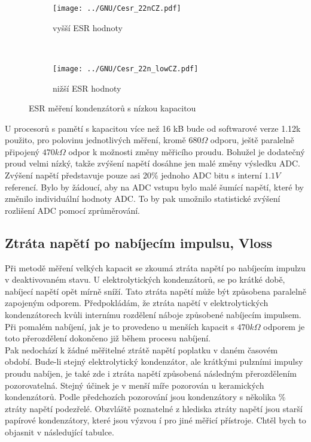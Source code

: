 \begin{figure}[H]
  \begin{subfigure}[b]{.5\textwidth}
    \centering
    \texttt{[image: ../GNU/Cesr\_22nCZ.pdf]}
    \caption{vyšší ESR hodnoty}
  \end{subfigure}
  ~
  \begin{subfigure}[b]{.5\textwidth}
    \centering
    \texttt{[image: ../GNU/Cesr\_22n\_lowCZ.pdf]}
    \caption{nižší ESR hodnoty}
  \end{subfigure}
  \caption{ESR měření kondenzátorů s nízkou kapacitou}
  \label{pic:Cesr_22n}
\end{figure}
 
U procesorů s pamětí s kapacitou více než 16 kB bude od softwarové verze 1.12k použito, pro polovinu jednotlivých měření, kromě \(680\Omega\) odporu, ještě paralelně připojený \(470k\Omega\) odpor
k možnosti změny měřicího proudu.
Bohužel je dodatečný proud velmi nízký, takže zvýšení napětí dosáhne jen malé změny výsledku ADC.
Zvýšení napětí představuje pouze asi 20\% jednoho ADC bitu s interní \(1.1V\) referencí.
Bylo by žádoucí, aby na ADC vstupu bylo malé šumící napětí, které by změnilo individuální hodnoty ADC.
To by pak umožnilo statistické zvýšení rozlišení ADC pomocí zprůměrování. 


\subsection{Ztráta napětí po nabíjecím impulsu, Vloss}
Při metodě měření velkých kapacit se zkoumá ztráta napětí po nabíjecím impulzu v deaktivovaném stavu.
U elektrolytických kondenzátorů, se po krátké době, nabíjecí napětí opět mírně sníží.
Tato ztráta napětí může být způsobena paralelně zapojeným odporem.
Předpokládám, že ztráta napětí v elektrolytických kondenzátorech kvůli internímu rozdělení náboje způsobené nabíjecím impulsem.
Při pomalém nabíjení, jak je to provedeno  u menších kapacit s \(470k\Omega\)  odporem
je toto přerozdělení dokončeno již během procesu nabíjení.\\ Pak nedochází k žádné měřitelné ztrátě napětí
poplatku v daném časovém období.
Bude-li stejný elektrolytický kondenzátor, ale krátkými pulzními impulsy proudu nabíjen, je také zde i ztráta napětí způsobená následným přerozdělením pozorovatelná.
Stejný účinek je v menší míře pozorován u keramických kondenzátorů.
Podle předchozích pozorování jsou kondenzátory s několika  \% ztráty napětí podezřelé.
Obzvláště poznatelné z hlediska ztráty napětí jsou starší papírové kondenzátory, které jsou výzvou í pro jiné měřicí přístroje. 
Chtěl bych to objasnit v následující tabulce.


